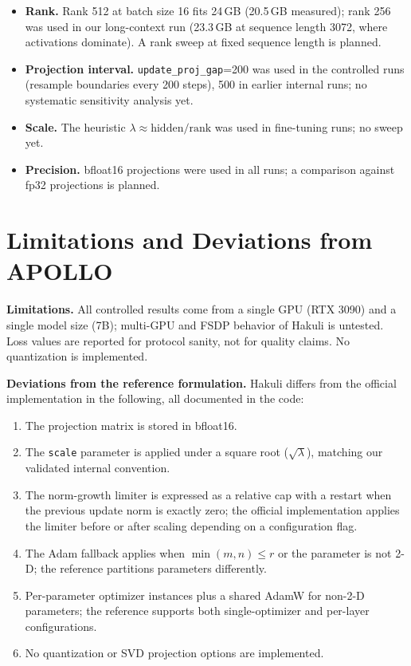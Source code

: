 \documentclass[11pt]{article}
\begin{document}
\begin{itemize}
  \item \textbf{Rank.} Rank 512 at batch size 16 fits 24\,GB (20.5\,GB
  measured); rank 256 was used in our long-context run (23.3\,GB at
  sequence length 3072, where activations dominate). A rank sweep at fixed
  sequence length is planned.
  \item \textbf{Projection interval.} \texttt{update\_proj\_gap}=200 was used
  in the controlled runs (resample boundaries every 200 steps), 500 in
  earlier internal runs; no systematic sensitivity analysis yet.
  \item \textbf{Scale.} The heuristic $\lambda \approx
  \mathrm{hidden}/\mathrm{rank}$ was used in fine-tuning runs; no sweep yet.
  \item \textbf{Precision.} bfloat16 projections were used in all runs; a
  comparison against fp32 projections is planned.
\end{itemize}

\section{Limitations and Deviations from APOLLO}
\label{sec:deviations}

\textbf{Limitations.} All controlled results come from a single GPU (RTX
3090) and a single model size (7B); multi-GPU and FSDP behavior of Hakuli is
untested. Loss values are reported for protocol sanity, not for quality
claims. No quantization is implemented.

\textbf{Deviations from the reference formulation.} Hakuli differs from the
official implementation in the following, all documented in the code:

\begin{enumerate}
  \item The projection matrix is stored in bfloat16.
  \item The \texttt{scale} parameter is applied under a square root
  ($\sqrt{\lambda}$), matching our validated internal convention.
  \item The norm-growth limiter is expressed as a relative cap with a
  restart when the previous update norm is exactly zero; the official
  implementation applies the limiter before or after scaling depending on a
  configuration flag.
  \item The Adam fallback applies when $\min(m,n) \leq r$ or the parameter is
  not 2-D; the reference partitions parameters differently.
  \item Per-parameter optimizer instances plus a shared AdamW for non-2-D
  parameters; the reference supports both single-optimizer and per-layer
  configurations.
  \item No quantization or SVD projection options are implemented.
\end{enumerate}
\end{document}
